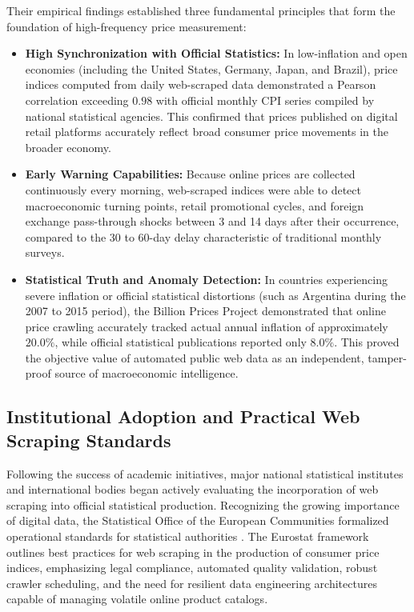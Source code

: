 \hs Their empirical findings established three fundamental principles that form the foundation of high-frequency price measurement:
\begin{itemize}
    \item \textbf{High Synchronization with Official Statistics:} In low-inflation and open economies (including the United States, Germany, Japan, and Brazil), price indices computed from daily web-scraped data demonstrated a Pearson correlation exceeding $0.98$ with official monthly CPI series compiled by national statistical agencies. This confirmed that prices published on digital retail platforms accurately reflect broad consumer price movements in the broader economy.
    \item \textbf{Early Warning Capabilities:} Because online prices are collected continuously every morning, web-scraped indices were able to detect macroeconomic turning points, retail promotional cycles, and foreign exchange pass-through shocks between 3 and 14 days after their occurrence, compared to the 30 to 60-day delay characteristic of traditional monthly surveys.
    \item \textbf{Statistical Truth and Anomaly Detection:} In countries experiencing severe inflation or official statistical distortions (such as Argentina during the 2007 to 2015 period), the Billion Prices Project demonstrated that online price crawling accurately tracked actual annual inflation of approximately $20.0\%$, while official statistical publications reported only $8.0\%$. This proved the objective value of automated public web data as an independent, tamper-proof source of macroeconomic intelligence.
\end{itemize}

\subsection{Institutional Adoption and Practical Web Scraping Standards}
\hs Following the success of academic initiatives, major national statistical institutes and international bodies began actively evaluating the incorporation of web scraping into official statistical production. Recognizing the growing importance of digital data, the Statistical Office of the European Communities formalized operational standards for statistical authorities \citep{eurostat2022webscraping}. The Eurostat framework outlines best practices for web scraping in the production of consumer price indices, emphasizing legal compliance, automated quality validation, robust crawler scheduling, and the need for resilient data engineering architectures capable of managing volatile online product catalogs.

